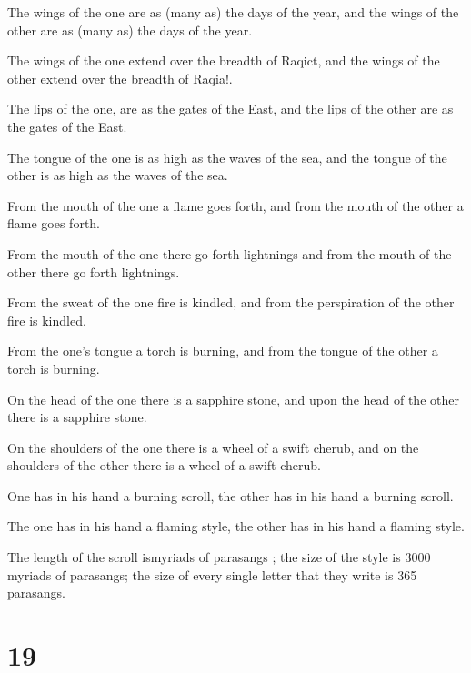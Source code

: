 \par The wings of the one are as (many as) the days of the year, and the wings of the other are as (many as) the days of the year. 

\par The wings of the one extend over the breadth of Raqict, and the wings of the other extend over the breadth of Raqia!. 

\par The lips of the one, are as the gates of the East, and the lips of the other are as the gates of the East. 

\par The tongue of the one is as high as the waves of the sea, and the tongue of the other is as high as the waves of the sea. 

\par From the mouth of the one a flame goes forth, and from the mouth of the other a flame goes forth. 

\par From the mouth of the one there go forth lightnings and from the mouth of the other there go forth lightnings. 

\par From the sweat of the one fire is kindled, and from the perspiration of the other fire is kindled. 

\par From the one's tongue a torch is burning, and from the tongue of the other a torch is burning. 

\par On the head of the one there is a sapphire stone, and upon the head of the other there is a sapphire stone. 

\par On the shoulders of the one there is a wheel of a swift cherub, and on the shoulders of the other there is a wheel of a swift cherub. 

\par One has in his hand a burning scroll, the other has in his hand a burning scroll. 

\par The one has in his hand a flaming style, the other has in his hand a flaming style. 

\par The length of the scroll ismyriads of parasangs ; the size of the style is 3000 myriads of parasangs; the size of every single letter that they write is 365 parasangs. 

\chapter{19}

